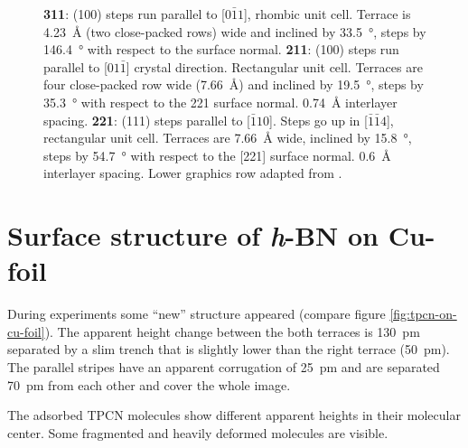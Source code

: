 \begin{figure}
{		\textbf{311}: (100) steps run parallel to [$0 \bar 1 1$], rhombic unit cell. Terrace is \SI{4,23}{\angstrom} (two close-packed rows) wide and inclined by \SI{33,5}{\degree}, steps by \SI{146,4}{\degree} with respect to the surface normal.
		\textbf{211}: (100) steps run parallel to [$0 1 \bar 1$] crystal direction. Rectangular unit cell. Terraces are four close-packed row wide (\SI{7,66}{\angstrom}) and inclined by \SI{19,5}{\degree}, steps by \SI{35,3}{\degree} with respect to the 221 surface normal. \SI{0,74}{\angstrom} interlayer spacing.
		\textbf{221}: (111) steps parallel to [$\bar 1 1 0$]. Steps go up in [$\bar 1 \bar 1 4$], rectangular unit cell. Terraces are \SI{7,66}{\angstrom} wide, inclined by \SI{15,8}{\degree}, steps by \SI{54,7}{\degree} with respect to the [221] surface normal. \SI{0,6}{\angstrom} interlayer spacing. Lower graphics row adapted from \cite{riemann_ionic_2002}.
	}
	\label{tab:step-heights}
\end{figure}

\section{Surface structure of \textit{h}-BN on Cu-foil}
During experiments some ``new'' structure appeared (compare figure \ref{fig:tpcn-on-cu-foil}).
The apparent height change between the both terraces is \SI{130}{\pico \meter} separated by a slim trench that is slightly lower than the right terrace (\SI{50}{\pico \meter}). The parallel stripes have an apparent corrugation of \SI{25}{\pico \meter} and are separated \SI{70}{\pico \meter} from each other and cover the whole image. 

The adsorbed TPCN molecules show different apparent heights in their molecular center. Some fragmented and heavily deformed molecules are visible.

